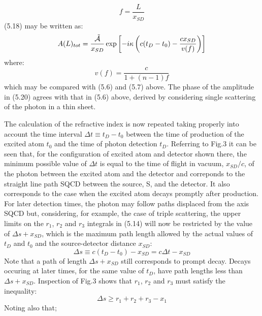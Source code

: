 \documentclass [12pt]{article}
\begin{document}
{\begin{equation}
  f = \frac{L}{x_{SD}}
  \end{equation}
   (5.18) may be written as:
     \begin{equation}
   A(L)_{tot} = \frac{\tilde{{\cal A}}}{x_{SD}}
   \exp\left[ - i \kappa\left(c(t_D-t_0)-\frac{c x_{SD}}{v(f)}\right)\right]
    \end{equation}
    where:
        \begin{equation}
     v(f) = \frac{c}{1+(n-1)f}
       \end{equation}
     which may be compared with (5.6) and (5.7) above.
      The phase of the amplitude in (5.20) agrees with that in (5.6) above,
      derived by considering single scattering of the photon in a thin sheet.
     \par  The calculation of the refractive index is now repeated taking properly into 
      account the time interval $\Delta t \equiv t_D-t_0$ between the time of production 
      of the excited atom $t_0$ and the time of photon detection $t_D$. Referring 
      to Fig.3 it can be seen that, for the configuration of excited atom and detector 
      shown there, the minimum possible value of $\Delta t$ is equal to the 
      time of flight in vacuum, $x_{SD}/c$, of the photon between the excited atom and the 
      detector and correponds to the straight line path SQCD between the source, S,
     and the detector. It also corresponds to the case when the excited atom decays promptly after
      production. For later detection times, the photon may follow
       paths displaced from
      the axis SQCD but, considering, for example, the case of triple scattering,
      the upper limits on the $r_1$, $r_2$ and $r_3$ integrals in (5.14) will now be
      restricted by the value of $\Delta s+x_{SD}$, which is the maximum
      path length allowed by the actual values of $t_D$ and $t_0$ and the source-detector
      distance  $x_{SD}$:
      \begin{equation}
      \Delta s \equiv c(t_D-t_0)-x_{SD} = c\Delta t-x_{SD} 
       \end{equation}
        Note that a path of length $\Delta s+x_{SD}$ still corresponds to prompt decay. Decays
     occuring at later times, for the same value of $t_D$, have path lengths less than
      $\Delta s+x_{SD}$.
       Inspection of Fig.3 shows that $r_1$, $r_2$ and $r_3$ must satisfy the inequality:
       \begin{equation}
       \Delta s \ge r_1 +  r_2 +  r_3- x_1  
       \end{equation}
        Noting also that;
}
\end{document}
